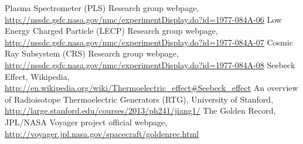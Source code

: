 \documentclass[11pt,a4paper]{article}
\begin{document}
\begin{thebibliography}{99}
 Plasma Spectrometer (PLS) Research group webpage,  \url{http://nssdc.gsfc.nasa.gov/nmc/experimentDisplay.do?id=1977-084A-06}
 Low Energy Charged Particle (LECP) Research group webpage,  \url{http://nssdc.gsfc.nasa.gov/nmc/experimentDisplay.do?id=1977-084A-07}
 Cosmic Ray Subsystem (CRS) Research group webpage,  \url{http://nssdc.gsfc.nasa.gov/nmc/experimentDisplay.do?id=1977-084A-08}
 Seebeck Effect, Wikipedia,  \url{http://en.wikipedia.org/wiki/Thermoelectric_effect#Seebeck_effect}
 An overview of Radioisotope Thermoelectric Generators (RTG), University of Stanford,  \url{http://large.stanford.edu/courses/2013/ph241/jiang1/}
 The Golden Record, JPL/NASA Voyager project official webpage, \url{http://voyager.jpl.nasa.gov/spacecraft/goldenrec.html}


\end{thebibliography}
\end{document}
